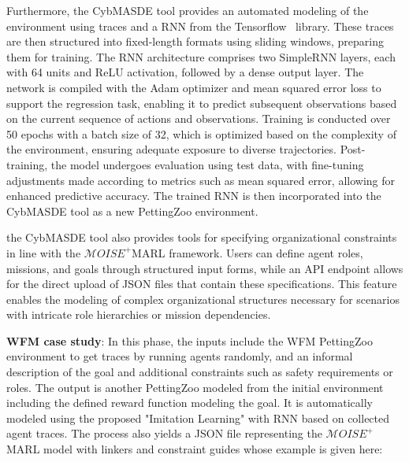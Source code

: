 \documentclass[sigconf,anonymous]{aamas}
\begin{document}
Furthermore, the CybMASDE tool provides an automated modeling of the environment using traces and a RNN from the Tensorflow~\cite{tensorflow2015-whitepaper} library.
These traces are then structured into fixed-length formats using sliding windows, preparing them for training. The RNN architecture comprises two SimpleRNN layers, each with 64 units and ReLU activation, followed by a dense output layer. The network is compiled with the Adam optimizer and mean squared error loss to support the regression task, enabling it to predict subsequent observations based on the current sequence of actions and observations. Training is conducted over 50 epochs with a batch size of 32, which is optimized based on the complexity of the environment, ensuring adequate exposure to diverse trajectories. Post-training, the model undergoes evaluation using test data, with fine-tuning adjustments made according to metrics such as mean squared error, allowing for enhanced predictive accuracy. The trained RNN is then incorporated into the CybMASDE tool as a new PettingZoo environment.

the CybMASDE tool also provides tools for specifying organizational constraints in line with the $\mathcal{M}OISE^+$MARL framework. Users can define agent roles, missions, and goals through structured input forms, while an API endpoint allows for the direct upload of JSON files that contain these specifications. This feature enables the modeling of complex organizational structures necessary for scenarios with intricate role hierarchies or mission dependencies.

\textbf{WFM case study}: In this phase, the inputs include the WFM PettingZoo environment to get traces by running agents randomly, and an informal description of the goal and additional constraints such as safety requirements or roles.
The output is another PettingZoo modeled from the initial environment including the defined reward function modeling the goal. It is automatically modeled using the proposed "Imitation Learning" with RNN based on collected agent traces. The process also yields a JSON file representing the $\mathcal{M}OISE^+$MARL model with linkers and constraint guides whose example is given here:
\end{document}
